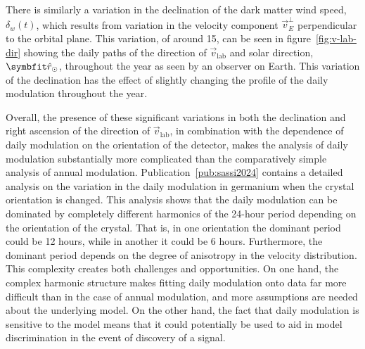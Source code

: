 There is similarly a variation in the declination of the dark matter wind speed, $\delta_w(t)$, which results from variation in the velocity component $\vec{v}_E^\perp$ perpendicular to the orbital plane. This variation, of around 15\degree{}, can be seen in figure~\ref{fig:v-lab-dir} showing the daily paths of the direction of $\vec{v}_\text{lab}$ and solar direction, $\unitv{r}_\odot$, throughout the year as seen by an observer on Earth. This variation of the declination has the effect of slightly changing the profile of the daily modulation throughout the year.

Overall, the presence of these significant variations in both the declination and right ascension of the direction of $\vec{v}_\text{lab}$, in combination with the dependence of daily modulation on the orientation of the detector, makes the analysis of daily modulation substantially more complicated than the comparatively simple analysis of annual modulation. Publication~\ref{pub:sassi2024} contains a detailed analysis on the variation in the daily modulation in germanium when the crystal orientation is changed. This analysis shows that the daily modulation can be dominated by completely different harmonics of the 24-hour period depending on the orientation of the crystal. That is, in one orientation the dominant period could be 12 hours, while in another it could be 6 hours. Furthermore, the dominant period depends on the degree of anisotropy in the velocity distribution. This complexity creates both challenges and opportunities. On one hand, the complex harmonic structure makes fitting daily modulation onto data far more difficult than in the case of annual modulation, and more assumptions are needed about the underlying model. On the other hand, the fact that daily modulation is sensitive to the model means that it could potentially be used to aid in model discrimination in the event of discovery of a signal.

